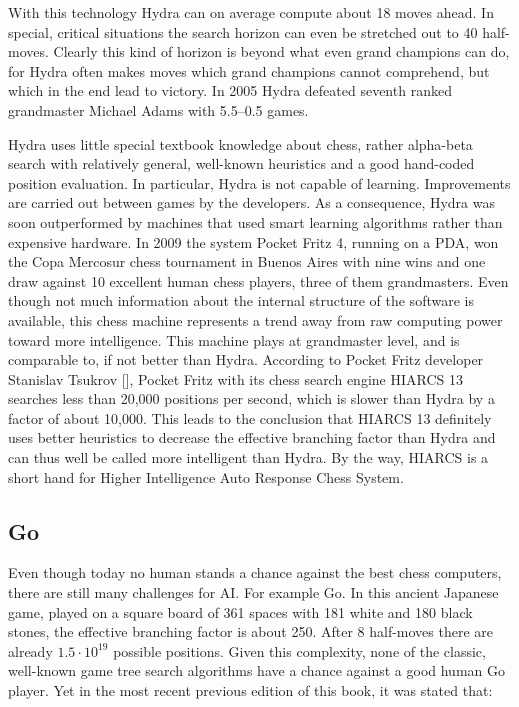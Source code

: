 \documentclass[10pt]{book}
\begin{document}
With this technology Hydra can on average compute about 18 moves ahead. In special, critical situations the search horizon can even be stretched out to 40 half-moves. Clearly this kind of horizon is beyond what even grand champions can do, for Hydra often makes moves which grand champions cannot comprehend, but which in the end lead to victory. In 2005 Hydra defeated seventh ranked grandmaster Michael Adams with 5.5--0.5 games.

Hydra uses little special textbook knowledge about chess, rather alpha-beta search with relatively general, well-known heuristics and a good hand-coded\\
position evaluation. In particular, Hydra is not capable of learning. Improvements are carried out between games by the developers. As a consequence, Hydra was soon outperformed by machines that used smart learning algorithms rather than expensive hardware.
In 2009 the system Pocket Fritz 4, running on a PDA, won the Copa Mercosur chess tournament in Buenos Aires with nine wins and one draw against 10 excellent human chess players, three of them grandmasters. Even though not much information about the internal structure of the software is available, this chess machine represents a trend away from raw computing power toward more intelligence. This machine plays at grandmaster level, and is comparable to, if not better than Hydra. According to Pocket Fritz developer Stanislav Tsukrov [\cite{wikipedia2013}], Pocket Fritz with its chess search engine HIARCS 13 searches less than 20,000 positions per second, which is slower than Hydra by a factor of about 10,000. This leads to the conclusion that HIARCS 13 definitely uses better heuristics to decrease the effective branching factor than Hydra and can thus well be called more intelligent than Hydra. By the way, HIARCS is a short hand for Higher Intelligence Auto Response Chess System.

\subsection{Go}
Even though today no human stands a chance against the best chess computers, there are still many challenges for AI. For example Go. In this ancient Japanese game, played on a square board of 361 spaces with 181 white and 180 black stones, the effective branching factor is about 250. After 8 half-moves there are already $1.5 \cdot 10^{19}$ possible positions. Given this complexity, none of the classic, well-known game tree search algorithms have a chance against a good human Go player. Yet in the most recent previous edition of this book, it was stated that:
\end{document}
